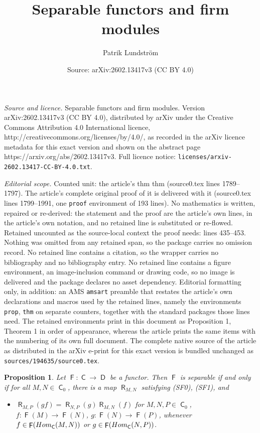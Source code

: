 \documentclass[10pt,a4paper]{amsart}
\title{Separable functors and firm modules}
\author{Patrik Lundstr\"om}
\date{Source: arXiv:2602.13417v3 (CC BY 4.0)}
\newtheorem{prop}{Proposition}
\DeclareMathOperator{\C}{\mathsf C}
\DeclareMathOperator{\D}{\mathsf D}
\DeclareMathOperator{\F}{\mathsf F}
\newcommand{\Hom}{{\rm Hom}}
\DeclareMathOperator{\R}{\mathsf R}
\begin{document}
\maketitle

\noindent\emph{Source and licence.} Separable functors and firm modules. Version arXiv:2602.13417v3 (CC BY 4.0), distributed by arXiv under the Creative Commons Attribution 4.0 International licence, http://creativecommons.org/licenses/by/4.0/, as recorded in the arXiv licence metadata for this exact version and shown on the abstract page https://arxiv.org/abs/2602.13417v3. Full licence notice: \texttt{licenses/arxiv-2602.13417-CC-BY-4.0.txt}.\par\smallskip

\noindent\textit{Editorial scope.} Counted unit: the article's thm thm (source0.tex lines 1789--1797). The article's complete original proof of it is delivered with it (source0.tex lines 1799--1991, one \texttt{proof} environment of 193 lines). No mathematics is written, repaired or re-derived: the statement and the proof are the article's own lines, in the article's own notation, and no retained line is substituted or re-flowed.  Retained uncounted as the source-local context the proof needs: lines 435--453.  Nothing was omitted from any retained span, so the package carries no omission record.  No retained line contains a citation, so the wrapper carries no bibliography and no bibliography entry.  No retained line contains a figure environment, an image-inclusion command or drawing code, so no image is delivered and the package declares no asset dependency.  Editorial formatting only, in addition: an AMS \texttt{amsart} preamble that restates the article's own declarations and macros used by the retained lines, namely the environments \texttt{prop}, \texttt{thm} on separate counters, together with the standard packages those lines need.  The retained environments print in this document as Proposition 1, Theorem 1 in order of appearance, whereas the article prints the same items with the numbering of its own full document.  The complete native source of the article as distributed in the arXiv e-print for this exact version is bundled unchanged as \texttt{sources/194635/source0.tex}.
\begin{prop}\label{prop:newsep}
Let $\F : \C \to \D$ be a functor. 
Then $\F$ is 
separable if and only if for all 
$M,N \in \C_0$, there is a map $\R_{M,N}$ 
satisfying (SF0), (SF1), and 
\begin{itemize}[widest=(SF2)]

\item[{\rm (SF3)}] 
$\R_{M,P}(gf) = 
\R_{N,P}(g) \R_{M,N}(f)$ for $M,N,P \in \C_0$,
$f : \F(M)  \to  \F(N)$, 
\linebreak
$g :  \F(N)  \to  \F(P)$, 
whenever
$f \in \F( \Hom_{\C}(M,N) )$ or 
$g \in \F( \Hom_{\C}(N,P))$.
\end{itemize}
\end{prop}
\end{document}
